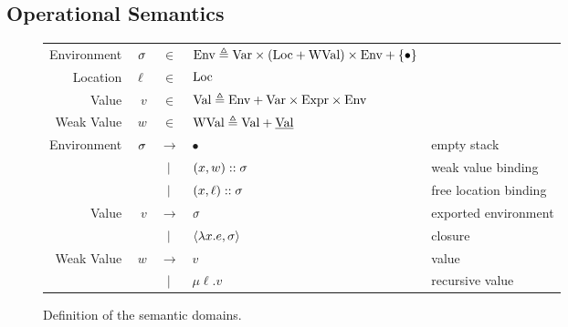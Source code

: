 \subsection{Operational Semantics}
\begin{figure}[h!]
  \centering
  \small
  \begin{tabular}{rrcll}
    Environment & $\sigma$ & $\in$         & $\text{Env}\triangleq\text{Var}\times(\text{Loc}+\text{WVal})\times\text{Env}+\{\bullet\}$                         \\
    Location    & $\ell$ & $\in$         & $\text{Loc}$                                                                                    \\
    Value       & $v$    & $\in$         & $\text{Val} \triangleq\text{Env}+\text{Var}\times\text{Expr}\times\text{Env}$                                     \\
    Weak Value  & $w$    & $\in$         & $\text{WVal}\triangleq\text{Val}+\underline{\text{Val}}$                                                 \\
    Environment & $\sigma$ & $\rightarrow$ & $\bullet$                                                         & empty stack           \\
                &        & $|$       & $(x,w):: \sigma$                                                 & weak value binding    \\
                &        & $|$       & $(x,\ell)::\sigma$                                               & free location binding \\
    Value       & $v$    & $\rightarrow$ & $\sigma$                                                            & exported environment  \\
                &        & $|$       & $\langle \lambda x.e, \sigma \rangle$                               & closure               \\
    Weak Value  & $w$    & $\rightarrow$ & $v$                                                               & value                 \\
                &        & $|$       & $\mu\ell.v$                                                       & recursive value
  \end{tabular}
  \caption{Definition of the semantic domains.}
  \label{fig:domain}
\end{figure}
